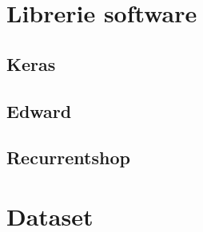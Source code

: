\section{Librerie software}
\subsection{Keras}
\subsection{Edward}
\subsection{Recurrentshop}
\section{Dataset}